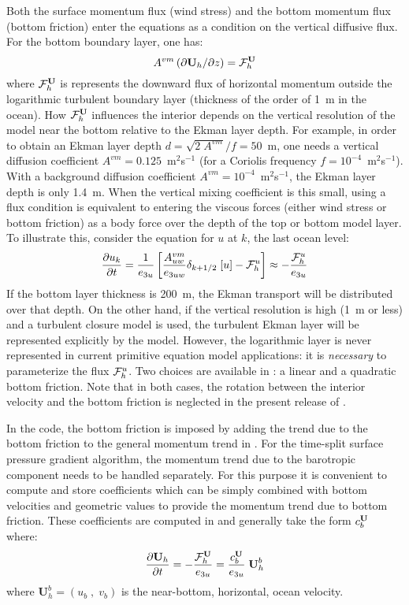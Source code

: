\documentclass[../tex_main/NEMO_manual]{subfiles}
\begin{document}
Both the surface momentum flux (wind stress) and the bottom momentum 
flux (bottom friction) enter the equations as a condition on the vertical 
diffusive flux. For the bottom boundary layer, one has:
\begin{equation} \label{eq:zdfbfr_flux}
A^{vm} \left( \partial {\textbf U}_h / \partial z \right) = {{\cal F}}_h^{\textbf U}
\end{equation}
where ${\cal F}_h^{\textbf U}$ is represents the downward flux of horizontal momentum 
outside the logarithmic turbulent boundary layer (thickness of the order of 
1~m in the ocean). How ${\cal F}_h^{\textbf U}$ influences the interior depends on the 
vertical resolution of the model near the bottom relative to the Ekman layer 
depth. For example, in order to obtain an Ekman layer depth 
$d = \sqrt{2\;A^{vm}} / f = 50$~m, one needs a vertical diffusion coefficient 
$A^{vm} = 0.125$~m$^2$s$^{-1}$ (for a Coriolis frequency 
$f = 10^{-4}$~m$^2$s$^{-1}$). With a background diffusion coefficient 
$A^{vm} = 10^{-4}$~m$^2$s$^{-1}$, the Ekman layer depth is only 1.4~m. 
When the vertical mixing coefficient is this small, using a flux condition is 
equivalent to entering the viscous forces (either wind stress or bottom friction) 
as a body force over the depth of the top or bottom model layer. To illustrate 
this, consider the equation for $u$ at $k$, the last ocean level:
\begin{equation} \label{eq:zdfbfr_flux2}
\frac{\partial u_k}{\partial t} = \frac{1}{e_{3u}} \left[ \frac{A_{uw}^{vm}}{e_{3uw}} \delta_{k+1/2}\;[u] - {\cal F}^u_h \right] \approx - \frac{{\cal F}^u_{h}}{e_{3u}}
\end{equation}
If the bottom layer thickness is 200~m, the Ekman transport will 
be distributed over that depth. On the other hand, if the vertical resolution 
is high (1~m or less) and a turbulent closure model is used, the turbulent 
Ekman layer will be represented explicitly by the model. However, the 
logarithmic layer is never represented in current primitive equation model 
applications: it is \emph{necessary} to parameterize the flux ${\cal F}^u_h $. 
Two choices are available in \NEMO: a linear and a quadratic bottom friction. 
Note that in both cases, the rotation between the interior velocity and the 
bottom friction is neglected in the present release of \NEMO.

In the code, the bottom friction is imposed by adding the trend due to the bottom 
friction to the general momentum trend in . For the time-split surface 
pressure gradient algorithm, the momentum trend due to the barotropic component 
needs to be handled separately. For this purpose it is convenient to compute and 
store coefficients which can be simply combined with bottom velocities and geometric 
values to provide the momentum trend due to bottom friction. 
These coefficients are computed in  and generally take the form 
$c_b^{\textbf U}$ where:
\begin{equation} \label{eq:zdfbfr_bdef}
\frac{\partial {\textbf U_h}}{\partial t} = 
  - \frac{{\cal F}^{\textbf U}_{h}}{e_{3u}} = \frac{c_b^{\textbf U}}{e_{3u}} \;{\textbf U}_h^b
\end{equation}
where $\textbf{U}_h^b = (u_b\;,\;v_b)$ is the near-bottom, horizontal, ocean velocity.
\end{document}
